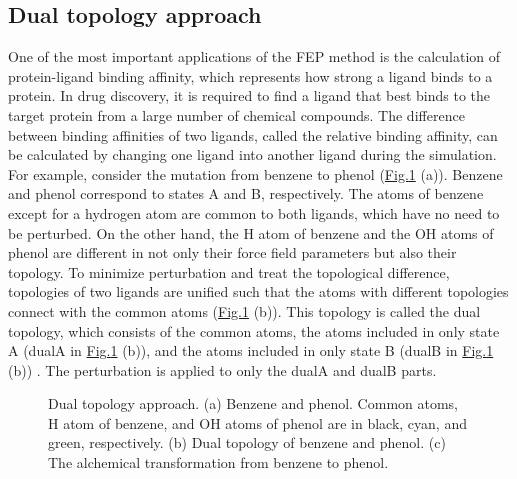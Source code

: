 \documentclass[a4paper,11pt,oneside,english]{sphinxmanual}
\begin{document}
\subsection{Dual topology approach}
\label{\detokenize{20_Alchemy:dual-topology-approach}}
One of the most important applications of the FEP method is the calculation of protein-ligand binding affinity, which represents how strong a ligand binds to a protein.
In drug discovery, it is required to find a ligand that best binds to the target protein from a large number of chemical compounds.
The difference between binding affinities of two ligands, called the relative binding affinity, can be calculated by changing one ligand into another ligand during the simulation.
For example, consider the mutation from benzene to phenol (\hyperref[\detokenize{20_Alchemy:dual-topology}]{Fig.\@ \ref{\detokenize{20_Alchemy:dual-topology}}} (a)).
Benzene and phenol correspond to states A and B, respectively.
The atoms of benzene except for a hydrogen atom are common to both ligands, which have no need to be perturbed.
On the other hand, the H atom of benzene and the OH atoms of phenol are different in not only their force field parameters but also their topology.
To minimize perturbation and treat the topological difference, topologies of two ligands are unified such that the atoms with different topologies connect with the common atoms (\hyperref[\detokenize{20_Alchemy:dual-topology}]{Fig.\@ \ref{\detokenize{20_Alchemy:dual-topology}}} (b)).
This topology is called the dual topology, which consists of the common atoms, the atoms included in only state A (dualA in \hyperref[\detokenize{20_Alchemy:dual-topology}]{Fig.\@ \ref{\detokenize{20_Alchemy:dual-topology}}} (b)), and the atoms included in only state B (dualB in \hyperref[\detokenize{20_Alchemy:dual-topology}]{Fig.\@ \ref{\detokenize{20_Alchemy:dual-topology}}} (b)) .
The perturbation is applied to only the dualA and dualB parts.

\begin{figure}[htbp]
\centering
\capstart

\noindent{}
\caption{Dual topology approach. (a) Benzene and phenol. Common atoms, H atom of benzene, and OH atoms of phenol are in black, cyan, and green, respectively. (b) Dual topology of benzene and phenol. (c) The alchemical transformation from benzene to phenol.}\label{\detokenize{20_Alchemy:dual-topology}}\end{figure}
\end{document}
